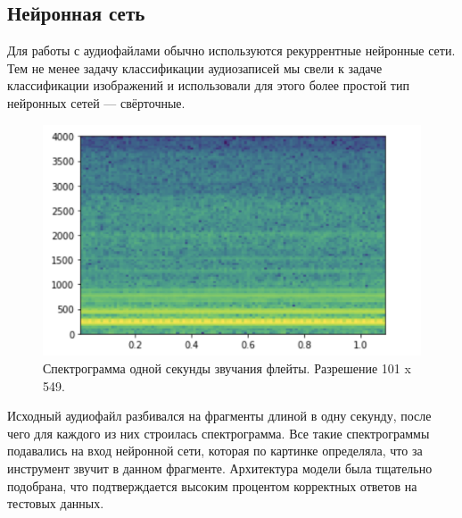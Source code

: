 \documentclass[14pt,a4paper]{article}
\begin{document}
\subsection{Нейронная сеть}

Для работы с аудиофайлами обычно используются рекуррентные нейронные сети. Тем не менее задачу классификации аудиозаписей мы свели к задаче классификации изображений и использовали для этого более простой тип нейронных сетей — свёрточные. \\

\begin{figure}[H]
\centering
\includegraphics[scale=0.3]{img/spectrogram.png}
\caption{Спектрограмма одной секунды звучания флейты. Разрешение 101 x 549.}
\end{figure}

Исходный аудиофайл разбивался на фрагменты длиной в одну секунду, после чего для каждого из них строилась спектрограмма. Все такие спектрограммы подавались на вход нейронной сети, которая по картинке определяла, что за инструмент звучит в данном фрагменте. Архитектура модели была тщательно подобрана, что подтверждается высоким процентом корректных ответов на тестовых данных.
\end{document}
